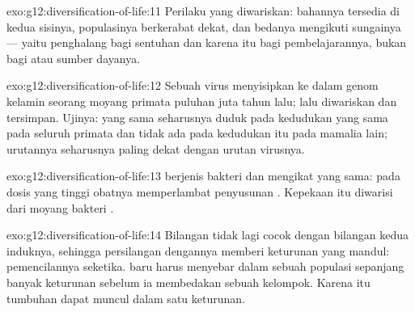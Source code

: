 \begin{solution}{exo:g12:diversification-of-life:11}
Perilaku yang diwariskan: bahannya tersedia di kedua sisinya,
populasinya berkerabat dekat, dan bedanya mengikuti sungainya --- yaitu
penghalang bagi sentuhan dan karena itu bagi pembelajarannya, bukan
bagi  atau sumber dayanya.
\end{solution}

\begin{solution}{exo:g12:diversification-of-life:12}
Sebuah virus menyisipkan  ke dalam genom  kelamin seorang
moyang primata puluhan juta tahun lalu;  lalu diwariskan dan
tersimpan. Ujinya:  yang sama seharusnya duduk pada kedudukan
 yang sama pada seluruh primata dan tidak ada pada kedudukan
itu pada mamalia lain; urutannya seharusnya paling dekat dengan urutan
virusnya.
\end{solution}

\begin{solution}{exo:g12:diversification-of-life:13}
  berjenis bakteri dan mengikat  yang
sama: pada dosis yang tinggi obatnya memperlambat penyusunan 
. Kepekaan itu diwarisi dari moyang bakteri .
\end{solution}

\begin{solution}{exo:g12:diversification-of-life:14}
Bilangan   tidak lagi cocok dengan bilangan
 kedua induknya, sehingga persilangan dengannya memberi
keturunan yang mandul: pemencilannya seketika.  baru harus menyebar
dalam sebuah populasi sepanjang banyak keturunan sebelum ia membedakan
sebuah kelompok. Karena itu  tumbuhan dapat muncul dalam satu keturunan.
\end{solution}

